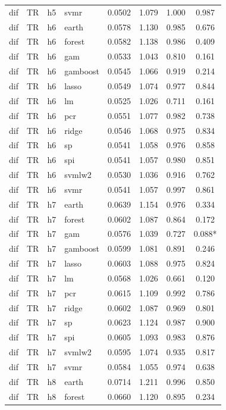 \begin{ThreePartTable}
\begin{longtable}[t]{llclcccc}
dif & TR & h5 & svmr & 0.0502 & 1.079 & 1.000 & 0.987\\
\addlinespace
dif & TR & h6 & earth & 0.0578 & 1.130 & 0.985 & 0.676\\
dif & TR & h6 & forest & 0.0582 & 1.138 & 0.986 & 0.409\\
dif & TR & h6 & gam & 0.0533 & 1.043 & 0.810 & 0.161\\
dif & TR & h6 & gamboost & 0.0545 & 1.066 & 0.919 & 0.214\\
dif & TR & h6 & lasso & 0.0549 & 1.074 & 0.977 & 0.844\\
dif & TR & h6 & lm & 0.0525 & 1.026 & 0.711 & 0.161\\
dif & TR & h6 & pcr & 0.0551 & 1.077 & 0.982 & 0.738\\
dif & TR & h6 & ridge & 0.0546 & 1.068 & 0.975 & 0.834\\
dif & TR & h6 & sp & 0.0541 & 1.058 & 0.976 & 0.858\\
dif & TR & h6 & spi & 0.0541 & 1.057 & 0.980 & 0.851\\
dif & TR & h6 & svmlw2 & 0.0530 & 1.036 & 0.916 & 0.762\\
dif & TR & h6 & svmr & 0.0541 & 1.057 & 0.997 & 0.861\\
\addlinespace
dif & TR & h7 & earth & 0.0639 & 1.154 & 0.976 & 0.334\\
dif & TR & h7 & forest & 0.0602 & 1.087 & 0.864 & 0.172\\
dif & TR & h7 & gam & 0.0576 & 1.039 & 0.727 & 0.088*\\
dif & TR & h7 & gamboost & 0.0599 & 1.081 & 0.891 & 0.246\\
dif & TR & h7 & lasso & 0.0603 & 1.088 & 0.975 & 0.824\\
dif & TR & h7 & lm & 0.0568 & 1.026 & 0.661 & 0.120\\
dif & TR & h7 & pcr & 0.0615 & 1.109 & 0.992 & 0.786\\
dif & TR & h7 & ridge & 0.0602 & 1.087 & 0.969 & 0.801\\
dif & TR & h7 & sp & 0.0623 & 1.124 & 0.987 & 0.900\\
dif & TR & h7 & spi & 0.0605 & 1.093 & 0.983 & 0.876\\
dif & TR & h7 & svmlw2 & 0.0595 & 1.074 & 0.935 & 0.817\\
dif & TR & h7 & svmr & 0.0584 & 1.055 & 0.974 & 0.638\\
\addlinespace
dif & TR & h8 & earth & 0.0714 & 1.211 & 0.996 & 0.850\\
dif & TR & h8 & forest & 0.0660 & 1.120 & 0.895 & 0.234\\

\end{longtable}
\end{ThreePartTable}
